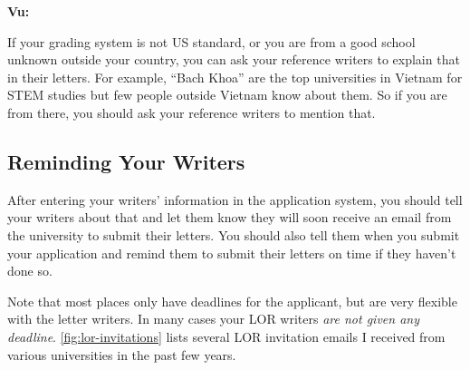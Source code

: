 \documentclass[oneside,11pt,dvipsnames]{book}
\newenvironment{commentbox}[1][]{
  \small
  \begin{mybox}
    {\small \textbf{#1}}
  }{
  \end{mybox}
}
\begin{document}
\begin{commentbox}[Vu:]
    If your grading system is not US standard, or you are from a good school unknown outside your country, you can ask your reference writers to explain that in their letters.  For example, ``Bach Khoa'' are the top universities in Vietnam for STEM studies but few people outside Vietnam know about them.  So if you are from there, you should ask your reference writers to mention that.
\end{commentbox}
  
  
\subsection{Reminding Your Writers}\label{sec:remind-writers}

After entering your writers' information in the application system, you should tell your writers about that and let them know they will soon receive an email from the university to submit their letters.  You should also tell them when you submit your application and remind them to submit their letters on time if they haven't done so. 

Note that most places only have deadlines for the applicant, but are very flexible with the letter writers.  In many cases your LOR writers \emph{are not given any deadline}. \autoref{fig:lor-invitations} lists several LOR invitation emails I received from various universities in the past few years. 
\end{document}
